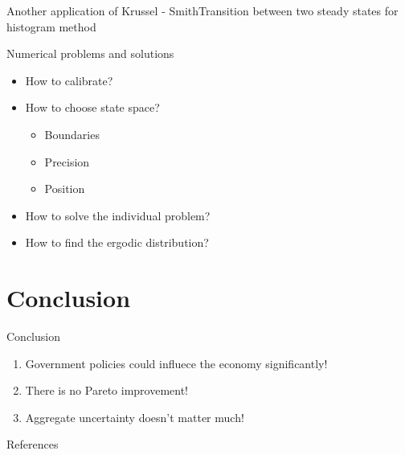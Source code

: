 \documentclass{beamer}
\begin{document}
\begin{frame}{Another application of Krussel - Smith}{Transition between two steady states for histogram method}
\end{frame}

\begin{frame}{Numerical problems and solutions}
  \begin{itemize}

  \item {
  How to calibrate?
  }

  

  \item {
  How to choose state space?

  \begin{itemize}
    \item Boundaries
    \item {
    Precision  
    }
    \item {
    Position  
    }
  \end{itemize}

  }

 
  \item {
  How to solve the individual problem?  
  }
  
  
  \item {
  How to find the ergodic distribution?  
  }
 



  \end{itemize}
\end{frame}


\section{Conclusion}
\begin{frame}{Conclusion}
  \begin{enumerate}

  \item {
  Government policies could influece the economy significantly!
  }

  \item {
  There is no Pareto improvement!
  }

  \item {
  Aggregate uncertainty doesn't matter much!
  }

  \end{enumerate}
\end{frame}

\appendix

\begin{frame}[allowframebreaks]{References}

\printbibliography
\end{frame}
\end{document}
